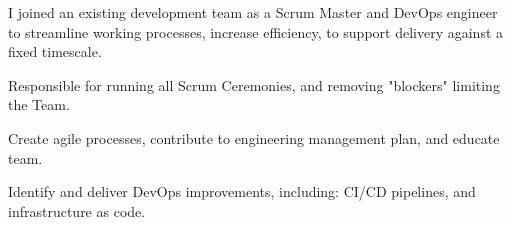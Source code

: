 I joined an existing development team as a Scrum Master and DevOps engineer to streamline working processes, increase efficiency, to support delivery against a fixed timescale.
\vspace{0.25em}
\begin{tightemize}
  \item Responsible for running all Scrum Ceremonies, and removing "blockers" limiting the Team.
  \item Create agile processes, contribute to engineering management plan, and educate team.
  \item Identify and deliver DevOps improvements, including: CI/CD pipelines, and infrastructure as code.
\end{tightemize}
\sectionsep{}
